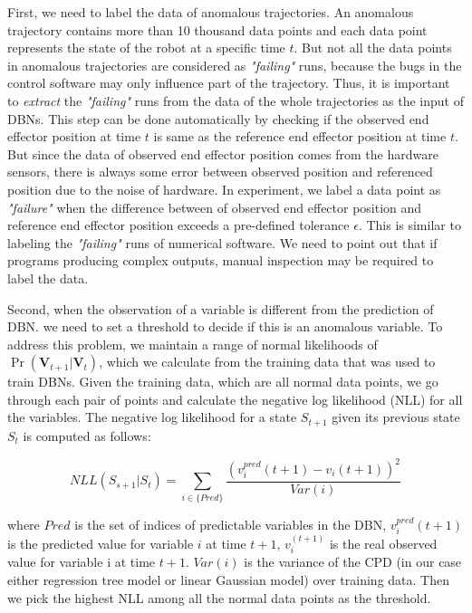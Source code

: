 First, we need to label the data of anomalous trajectories. An anomalous trajectory contains more than 10 thousand data points and each data point represents the state of the robot at a specific time $t$. But not all the data points in anomalous trajectories are considered as {\it "failing"} runs, because the bugs in the control software may only influence part of the trajectory. Thus, it is important to {\it extract} the {\it "failing"} runs from the data of the whole trajectories as the input of DBNs. This step can be done automatically by checking if the observed end effector position at time $t$ is same as the reference end effector position at time $t$. But since the data of observed end effector position comes from the hardware sensors, there is always some error between observed position and referenced position due to the noise of hardware.  In experiment, we label a data point as {\it "failure"} when the difference between of observed end effector position and reference end effector position exceeds a pre-defined tolerance $\epsilon$. This is similar to labeling the {\it "failing"} runs of numerical software. We need to point out that if programs producing complex outputs, manual inspection may be required to label the data.

Second, when the observation of a variable is different from the prediction of DBN. we need to set a threshold to decide if this is an anomalous variable. To address this problem, we maintain a range of normal likelihoods of $\Pr ({\pmb{V}_{t + 1}}|{\pmb{V}_t})$, which we calculate from the training data that was used to train DBNs.  Given the training data, which are all normal data points, we go through each pair of points and calculate the negative log likelihood (NLL) for all the variables. The negative log likelihood for a state $S_{t+1}$ given its previous state ${S_t}$ is computed as follows:

\begin{equation}
NLL({S_{s + 1}}|{S_t}) = \sum\limits_{i \in \{ Pred\} } {\frac{{{{(v_i^{pred}(t + 1) - {v_i}(t + 1))}^2}}}{{Var(i)}}} 
\end{equation}

where $Pred$ is the set of indices of predictable variables in the DBN, $v_{i}^{pred}(t+1)$ is the predicted value for variable $i$ at time $t + 1$, $v_{i}^{(t + 1)}$ is the real observed value for variable i at time $t+ 1$. $Var(i)$ is the variance of the CPD (in our case either regression tree model or linear Gaussian model) over training data. Then we pick the highest NLL among all the normal data points as the threshold. 

